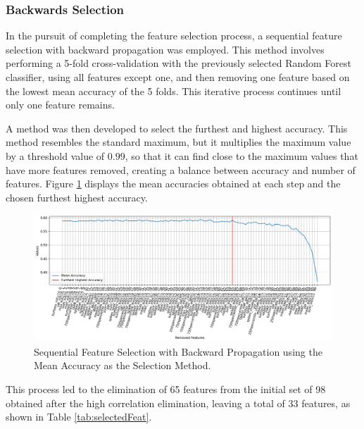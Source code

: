 \subsubsection{Backwards Selection}

In the pursuit of completing the feature selection process, a sequential feature selection with backward propagation was employed. This method involves performing a 5-fold cross-validation with the previously selected Random Forest classifier, using all features except one, and then removing one feature based on the lowest mean accuracy of the 5 folds. This iterative process continues until only one feature remains.

A method was then developed to select the furthest and highest accuracy. This method resembles the standard maximum, but it multiplies the maximum value by a threshold value of $0.99$, so that it can find close to the maximum values that have more features removed, creating a balance between accuracy and number of features. Figure \ref{fig:backProp1} displays the mean accuracies obtained at each step and the chosen furthest highest accuracy.

\begin{figure}[H]
	\centering
	\includegraphics[width=1\linewidth]{figs/4_1_traditional/backProp1.png}
	\caption{Sequential Feature Selection with Backward Propagation using the Mean Accuracy as the Selection Method.}
	\label{fig:backProp1}
\end{figure}

This process led to the elimination of 65 features from the initial set of 98 obtained after the high correlation elimination, leaving a total of 33 features, as shown in Table \ref{tab:selectedFeat}.

